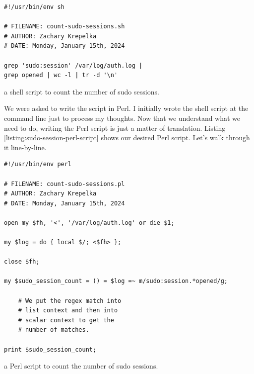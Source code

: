 \documentclass{article}
\begin{document}
\begin{listing}[h]
\begin{verbatim}
#!/usr/bin/env sh

# FILENAME: count-sudo-sessions.sh
# AUTHOR: Zachary Krepelka
# DATE: Monday, January 15th, 2024

grep 'sudo:session' /var/log/auth.log |
grep opened | wc -l | tr -d '\n'
\end{verbatim}
\caption{a shell script to count the number of sudo sessions.}
\label{listing:sudo-session-shell-script}
\end{listing}

We were asked to write the script in Perl. I initially wrote the shell script at
the command line just to process my thoughts. Now that we understand what we
need to do, writing the Perl script is just a matter of translation.  Listing
\ref{listing:sudo-session-perl-script} shows our desired Perl script.  Let's
walk through it line-by-line.

\begin{listing}
\begin{verbatim}
#!/usr/bin/env perl

# FILENAME: count-sudo-sessions.pl
# AUTHOR: Zachary Krepelka
# DATE: Monday, January 15th, 2024

open my $fh, '<', '/var/log/auth.log' or die $1;

my $log = do { local $/; <$fh> };

close $fh;

my $sudo_session_count = () = $log =~ m/sudo:session.*opened/g;

	# We put the regex match into
	# list context and then into
	# scalar context to get the
	# number of matches.

print $sudo_session_count;
\end{verbatim}
\caption{a Perl script to count the number of sudo sessions.}
\label{listing:sudo-session-perl-script}
\end{listing}


\end{document}
